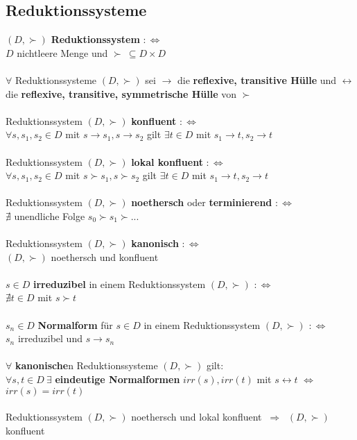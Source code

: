 \documentclass[a4paper,11pt]{scrartcl}
\newcommand{\tbf}{\textbf}
\newcommand{\Lra}{\Leftrightarrow}
\theoremstyle{default}
\begin{document}
\subsection{Reduktionssysteme}
$(D,\succ)$ \tbf{Reduktionssystem} $:\Lra$ \\
$D$ nichtleere Menge und $\succ \ \subseteq D \times D$ \\
\ \\ $\forall$ Reduktionssysteme $(D, \succ)$ sei $\rightarrow$ die \tbf{reflexive, transitive Hülle} und $\leftrightarrow$ die \tbf{reflexive, transitive, symmetrische Hülle}  von $\succ$ \\
\ \\ Reduktionssystem $(D, \succ)$ \tbf{konfluent} $:\Lra$ \\
$\forall s, s_1, s_2 \in D$ mit $s \rightarrow s_1, s \rightarrow s_2$ gilt $\exists t \in D$ mit $s_1 \rightarrow t, s_2 \rightarrow t$ \\
\ \\ Reduktionssystem $(D, \succ)$ \tbf{lokal konfluent} $:\Lra$ \\
$\forall s, s_1, s_2 \in D$ mit $s \succ s_1, s \succ s_2$ gilt $\exists t \in D$ mit $s_1 \rightarrow t, s_2 \rightarrow t$ \\
\ \\ Reduktionssystem $(D, \succ)$ \tbf{noethersch} oder \tbf{terminierend} $:\Lra$ \\
$\nexists$ unendliche Folge $s_0 \succ s_1 \succ ...$ \\
\ \\ Reduktionssystem $(D, \succ)$ \tbf{kanonisch} $:\Lra$ \\
$(D, \succ)$ noethersch und konfluent \\
\ \\ $s \in D$ \tbf{irreduzibel} in einem Reduktionssystem $(D, \succ)$ $:\Lra$ \\
$\nexists t \in D$ mit $s \succ t$ \\
\ \\ $s_n \in D$ \tbf{Normalform} für $s \in D$ in einem Reduktionssystem $(D, \succ)$ $:\Lra$ \\
$s_n$ irreduzibel und $s \rightarrow s_n$ \\
\ \\ $\forall$ \tbf{kanonische}n Reduktionssysteme $(D, \succ)$ gilt: \\
$\forall s,t \in D \ \exists$ \tbf{eindeutige Normalformen} $irr(s), irr(t)$ mit $s \leftrightarrow t$ $\Lra$ $irr(s) = irr(t)$ \\
\ \\ Reduktionssystem $(D, \succ)$ noethersch und lokal konfluent $\ \Rightarrow \ $ $(D, \succ)$ konfluent \\
\end{document}
